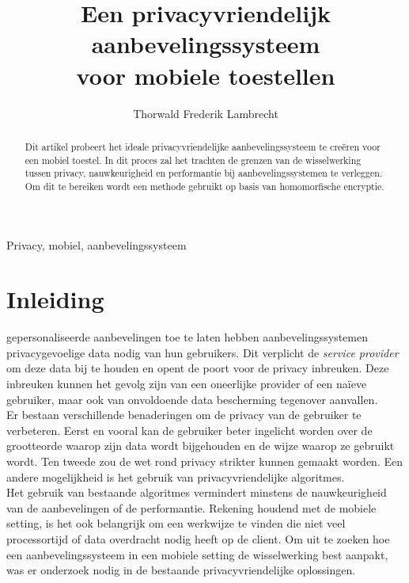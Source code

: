 \documentclass[twocolumn]{phdsymp} %
\begin{document}
\title{Een privacyvriendelijk aanbevelingssysteem\\ voor mobiele toestellen} %

\author{Thorwald Frederik Lambrecht}


\maketitle

\begin{abstract}
Dit artikel probeert het ideale privacyvriendelijke aanbevelingssysteem te cre\"eren voor een mobiel toestel. In dit proces zal het trachten de grenzen van de wisselwerking tussen privacy, nauwkeurigheid en performantie bij aanbevelingssystemen te verleggen. Om dit te bereiken wordt een methode gebruikt op basis van homomorfische encryptie.
\end{abstract}

\begin{keywords}
Privacy, mobiel, aanbevelingssysteem
\end{keywords}

\section{Inleiding}
 gepersonaliseerde aanbevelingen toe te laten hebben aanbevelingssystemen privacygevoelige data nodig van hun gebruikers. Dit verplicht de \emph{service provider} om deze data bij te houden en 
opent de poort voor de privacy inbreuken. Deze inbreuken kunnen het gevolg zijn van een oneerlijke provider of een na\"ieve gebruiker, maar ook van onvoldoende data bescherming tegenover aanvallen.\\ Er bestaan verschillende benaderingen om de privacy van de gebruiker te verbeteren. Eerst en vooral kan de gebruiker beter ingelicht worden over de grootteorde waarop zijn data wordt bijgehouden en de wijze waarop ze gebruikt wordt. Ten tweede zou de wet rond privacy strikter kunnen gemaakt worden. Een andere mogelijkheid is het gebruik van privacyvriendelijke algoritmes.\\
Het gebruik van bestaande algoritmes vermindert minstens de nauwkeurigheid van de aanbevelingen of de performantie. Rekening houdend met de mobiele setting, is het ook belangrijk om een werkwijze te vinden die niet veel processortijd of data overdracht nodig heeft op de client. Om uit te zoeken hoe een aanbevelingssysteem in een mobiele setting de wisselwerking best aanpakt, was er onderzoek nodig in de bestaande privacyvriendelijke oplossingen.
\end{document}
